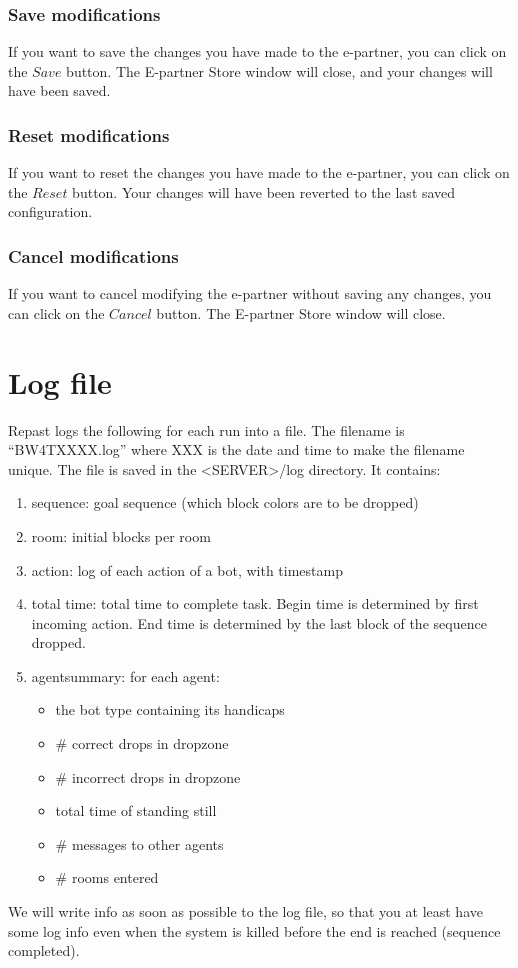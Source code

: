\documentclass[11pt,a4paper]{article}
\begin{document}
\subsubsection{Save modifications}
If you want to save the changes you have made to the e-partner, you can click on the $Save$ button. The E-partner Store window will close, and your changes will have been saved.

\subsubsection{Reset modifications}
If you want to reset the changes you have made to the e-partner, you can click on the $Reset$ button. Your changes will have been reverted to the last saved configuration.

\subsubsection{Cancel modifications}
If you want to cancel modifying the e-partner without saving any changes, you can click on the $Cancel$ button. The E-partner Store window will close.

\section{Log file}
Repast logs the following for each run into a file. The filename is “BW4TXXXX.log” where XXX is the date and time to make the filename unique. The file is saved in the <SERVER>/log directory. It contains:
\begin{enumerate}
\item sequence: goal sequence (which block colors are to be dropped)
\item room: initial blocks per room
\item action: log of each action of a bot, with timestamp 
\item total time: total time to complete task. Begin time is determined by first incoming action. End time is determined by the last block of the sequence dropped.
\item agentsummary: for each agent:
    \begin{itemize}
    \item the bot type containing its handicaps
    \item \# correct drops in dropzone
    \item \# incorrect drops in dropzone
    \item total time of standing still
    \item \# messages to other agents
    \item \# rooms entered
    \end{itemize}
\end{enumerate}
We will write info as soon as possible to the log file, so that you at least have some log info even when the system is killed before the end is reached (sequence completed).
\end{document}
